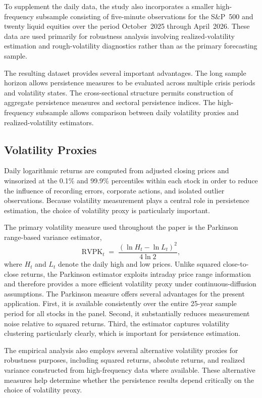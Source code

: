 \documentclass[unnumsec,webpdf,contemporary,large]{oup-authoring-template}%
\theoremstyle{thmstyleone}%
\theoremstyle{thmstyletwo}%
\theoremstyle{thmstylethree}%
\begin{document}
To supplement the daily data, the study also incorporates a smaller
high-frequency subsample consisting of five-minute observations for the
S\&P~500 and twenty liquid equities over the period October~2025 through
April~2026. These data are used primarily for robustness analysis involving
realized-volatility estimation and rough-volatility diagnostics rather than
as the primary forecasting sample.

The resulting dataset provides several important advantages. The long
sample horizon allows persistence measures to be evaluated across multiple
crisis periods and volatility states. The cross-sectional structure permits
construction of aggregate persistence measures and sectoral persistence
indices. The high-frequency subsample allows comparison between daily
volatility proxies and realized-volatility estimators.

\subsection{Volatility Proxies}

Daily logarithmic returns are computed from adjusted closing prices and
winsorized at the 0.1\% and 99.9\% percentiles within each stock in order
to reduce the influence of recording errors, corporate actions, and
isolated outlier observations. Because volatility measurement plays a
central role in persistence estimation, the choice of volatility proxy is
particularly important.

The primary volatility measure used throughout the paper is the Parkinson
range-based variance estimator,
\begin{equation}
  \mathrm{RVPK}_t \;=\; \frac{(\ln H_t - \ln L_t)^2}{4\ln 2},
  \label{eq:parkinson}
\end{equation}
where $H_t$ and $L_t$ denote the daily high and low prices. Unlike squared
close-to-close returns, the Parkinson estimator exploits intraday price
range information and therefore provides a more efficient volatility proxy
under continuous-diffusion assumptions. The Parkinson measure offers several
advantages for the present application. First, it is available consistently
over the entire 25-year sample period for all stocks in the panel. Second,
it substantially reduces measurement noise relative to squared returns.
Third, the estimator captures volatility clustering particularly clearly,
which is important for persistence estimation.

The empirical analysis also employs several alternative volatility proxies
for robustness purposes, including squared returns, absolute returns, and
realized variance constructed from high-frequency data where available.
These alternative measures help determine whether the persistence results
depend critically on the choice of volatility proxy.
\end{document}

